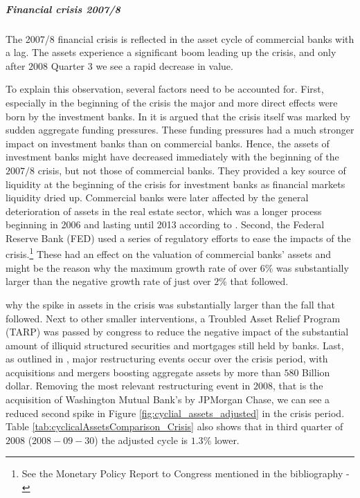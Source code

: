 \documentclass[12pt, a4paper]{article} %
\begin{document}
\subparagraph{Financial crisis 2007/8}
The 2007/8 financial crisis is reflected in the asset cycle of commercial banks with a lag. The assets experience a significant boom leading up the crisis, and only after $2008$ Quarter 3 we see a rapid decrease in value.


To explain this observation, several factors need to be accounted for. First, especially in the beginning of the crisis the major and more direct effects were born by the investment banks. In \citet{antoniades2019commercial} it is argued that the crisis itself was marked by sudden aggregate funding pressures. These funding pressures had a much stronger impact on investment banks than on commercial banks. Hence, the assets of investment banks might have decreased immediately with the beginning of the $2007/8$ crisis, but not those of commercial banks. They provided a key source of liquidity at the beginning of the crisis for investment banks as financial markets liquidity dried up. Commercial banks were later affected by the general deterioration of assets in the real estate sector, which was a longer process beginning in 2006 and lasting until 2013 according to \citet{antoniades2019commercial}.
Second, the Federal Reserve Bank (FED) used a series of regulatory efforts to ease the impacts of the crisis.\footnote{See the Monetary Policy Report to Congress mentioned in the bibliography - \citep{FEDReport}} These had an effect on the valuation of commercial banks' assets and might be the reason why the maximum growth rate of over $6$\% was substantially larger than the negative growth rate of just over $2$\% that followed. 

 why the spike in assets in the crisis was substantially larger than the fall that followed. Next to other smaller interventions, a Troubled Asset Relief Program (TARP) was passed by congress to reduce the negative impact of the substantial amount of  illiquid  structured  securities  and  mortgages  still held  by  banks. 
Last, as outlined in \citet{bech2009profits}, major restructuring events occur over the crisis period, with acquisitions and mergers boosting aggregate assets by more than $580$ Billion dollar. Removing the most relevant restructuring event in $2008$, that is the acquisition of  Washington Mutual  Bank's  by JPMorgan Chase, we can see a reduced second spike in Figure \ref{fig:cyclial_assets_adjusted} in the crisis period. Table \ref{tab:cyclicalAssetsComparison_Crisis} also shows that in third quarter of $2008$ ($2008-09-30$) the adjusted cycle is $1.3$\% lower. 
\end{document}
